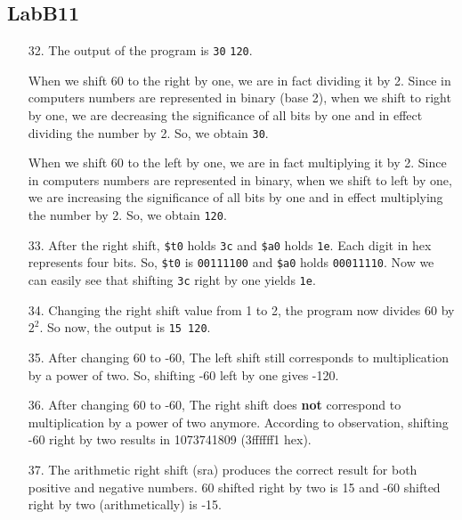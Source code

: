 \documentclass{article}
\begin{document}
\subsection{LabB11}
\begin{enumerate}
\item[32. ] The output of the program is \verb$30$ \verb$120$.\newline

When we shift 60 to the right by one, we are in fact dividing it by 2. Since in computers numbers are represented in binary (base 2), when we shift to right by one, we are decreasing the significance of all bits by one and in effect dividing the number by 2. So, we obtain \verb$30$.\newline

When we shift 60 to the left by one, we are in fact multiplying it by 2. Since in computers numbers are represented in binary, when we shift to left by one, we are increasing the significance of all bits by one and in effect multiplying the number by 2. So, we obtain \verb$120$.\newline

\item[33. ] After the right shift, \verb#$t0# holds \verb$3c$ and \verb#$a0# holds \verb$1e$. Each digit in hex represents four bits. So, \verb#$t0# is \verb$00111100$ and \verb#$a0# holds \verb$00011110$. Now we can easily see that shifting \verb$3c$ right by one yields \verb$1e$.

\item[34. ] Changing the right shift value from 1 to 2, the program now divides 60 by $2^2$. So now, the output is \verb$15 120$.

\item[35. ] After changing 60 to -60, The left shift still corresponds to multiplication by a power of two. So, shifting -60 left by one gives -120.

\item[36. ] After changing 60 to -60, The right shift does \textbf{not} correspond to multiplication by a power of two anymore. According to observation, shifting -60 right by two results in 1073741809 (3ffffff1 hex).

\item[37. ] The arithmetic right shift (sra) produces the correct result for both positive and negative numbers. 60 shifted right by two is 15 and -60 shifted right by two (arithmetically) is -15.
\end{enumerate}
\end{document}
